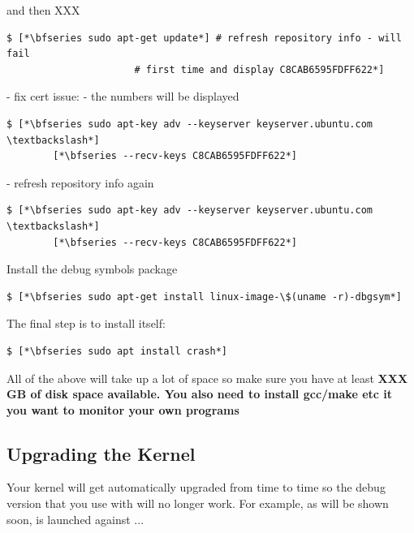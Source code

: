 \noindent
and then XXX

\begin{lstlisting}
$ [*\bfseries sudo apt-get update*] # refresh repository info - will fail 
                      # first time and display C8CAB6595FDFF622*]
\end{lstlisting}

\noindent
- fix cert issue: - the numbers will be displayed

\begin{lstlisting}
$ [*\bfseries sudo apt-key adv --keyserver keyserver.ubuntu.com \textbackslash*]
        [*\bfseries --recv-keys C8CAB6595FDFF622*]
\end{lstlisting}

\noindent
- refresh repository info again

\begin{lstlisting}
$ [*\bfseries sudo apt-key adv --keyserver keyserver.ubuntu.com \textbackslash*]
        [*\bfseries --recv-keys C8CAB6595FDFF622*]
\end{lstlisting}

\noindent
Install the debug symbols package

\begin{lstlisting}
$ [*\bfseries sudo apt-get install linux-image-\$(uname -r)-dbgsym*]
\end{lstlisting}

\noindent
The final step is to install  itself:

\begin{lstlisting}
$ [*\bfseries sudo apt install crash*]
\end{lstlisting}

\noindent
All of the above will take up a lot of space so make sure you have at least \textbf{XXX GB of disk space available. You also need to install gcc/make etc it you want to monitor your own programs}


\subsection{Upgrading the Kernel}

Your kernel will get automatically upgraded from time to time so the debug version that you use with  will no longer work. For example, as will be shown soon,  is launched against ...

